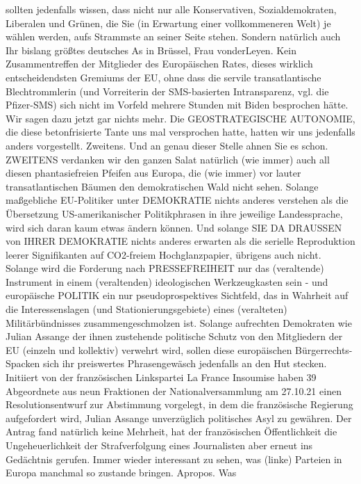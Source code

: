 \begin{multicols}{2}
{sollten jedenfalls wissen, dass nicht nur alle Konservativen, Sozialdemokraten, Liberalen und Grünen, die Sie
(in Erwartung einer vollkommeneren Welt) je wählen
werden, aufs Strammste an seiner Seite stehen. Sondern natürlich auch Ihr bislang größtes deutsches As in
Brüssel, Frau vonderLeyen. Kein Zusammentreffen der
Mitglieder des Europäischen Rates, dieses wirklich entscheidendsten Gremiums der EU, ohne dass die servile
transatlantische Blechtrommlerin (und Vorreiterin der
SMS-basierten Intransparenz, vgl. die Pfizer-SMS) sich
nicht im Vorfeld mehrere Stunden mit Biden besprochen
hätte. Wir sagen dazu jetzt gar nichts mehr. Die GEOSTRATEGISCHE AUTONOMIE, die diese betonfrisierte
Tante uns mal versprochen hatte, hatten wir uns jedenfalls anders vorgestellt.\textCR
Zweitens.\textCR
Und an genau dieser Stelle ahnen Sie es schon. ZWEITENS verdanken wir den ganzen Salat natürlich (wie
immer) auch all diesen phantasiefreien Pfeifen aus Europa, die (wie immer) vor lauter transatlantischen Bäumen den demokratischen Wald nicht sehen. Solange
maßgebliche EU-Politiker unter DEMOKRATIE nichts
anderes verstehen als die Übersetzung US-amerikanischer Politikphrasen in ihre jeweilige Landessprache,
wird sich daran kaum etwas ändern können. Und solange SIE DA DRAUSSEN von IHRER DEMOKRATIE nichts
anderes erwarten als die serielle Reproduktion leerer Signifikanten auf CO2-freiem Hochglanzpapier, übrigens
auch nicht. Solange wird die Forderung nach PRESSEFREIHEIT nur das (veraltende) Instrument in einem
(veraltenden) ideologischen Werkzeugkasten sein - und
europäische POLITIK ein nur pseudoprospektives Sichtfeld, das in Wahrheit auf die Interessenslagen (und Stationierungsgebiete) eines (veralteten) Militärbündnisses
zusammengeschmolzen ist.\textCR
Solange aufrechten Demokraten wie Julian Assange der
ihnen zustehende politische Schutz von den Mitgliedern
der EU (einzeln und kollektiv) verwehrt wird, sollen diese europäischen Bürgerrechts-Spacken sich ihr preiswertes Phrasengewäsch jedenfalls an den Hut stecken.\textCR
Initiiert von der französischen Linkspartei La France Insoumise haben 39 Abgeordnete aus neun Fraktionen der
Nationalversammlung am 27.10.21 einen Resolutionsentwurf zur Abstimmung vorgelegt, in dem die französische Regierung aufgefordert wird, Julian Assange unverzüglich politisches Asyl zu gewähren. Der Antrag fand
natürlich keine Mehrheit, hat der französischen Öffentlichkeit die Ungeheuerlichkeit der Strafverfolgung eines
Journalisten aber erneut ins Gedächtnis gerufen.\textCR
Immer wieder interessant zu sehen, was (linke) Parteien
in Europa manchmal so zustande bringen. Apropos. Was
}
\end{multicols}
